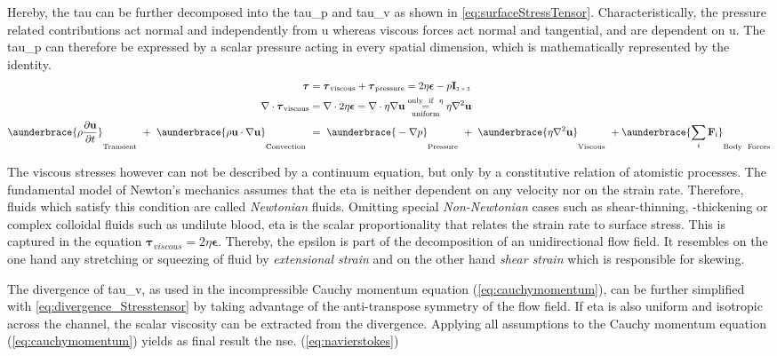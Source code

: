 Hereby, the \gls{tau} can be further decomposed into the \gls{tau_p} and \gls{tau_v} as shown in \cref{eq:surfaceStressTensor}. Characteristically, the pressure related contributions act normal and independently from \gls{u} whereas viscous forces act normal and tangential, and are dependent on \gls{u}. The \gls{tau_p} can therefore be expressed by a scalar pressure acting in every spatial dimension, which is mathematically represented by the identity. 
\begin{align}
	\boldsymbol{\tau} &= \boldsymbol{\tau}_\text{viscous} +  \boldsymbol{\tau}_\text{pressure} = 2\eta \boldsymbol{\epsilon} - p \mathbf{I}_\text{\scaleto{3 \times 3}{4pt}} \label{eq:surfaceStressTensor}\\
	\nabla \cdot \boldsymbol{\tau}_\text{viscous} &= \nabla \cdot 2\eta \boldsymbol{\epsilon} = \nabla \cdot \eta \nabla \mathbf{u} \underset{\text{uniform}}{\overset{\text{only \ if \ }\eta}{=}} \eta \nabla^2 \mathbf{u} 	\label{eq:divergence_Stresstensor} \\
	\aunderbrace{\vphantom{\sum_{i}} \rho \frac{\partial \mathbf{u}}{\partial t}}_{\text{Transient}}\ +\ \aunderbrace{\vphantom{\sum_{i}}\rho\mathbf{u} \cdot \nabla \mathbf{u}}_{\text{Convection}}\ &=\ \aunderbrace{\vphantom{\sum_{i}}-\nabla p}_{\text{Pressure}}\ +\ \aunderbrace{\vphantom{\sum_{i}}\eta \nabla^2 \mathbf{u}}_{\text{Viscous}}\ + \aunderbrace{\sum_{i}\mathbf{F}_\text{i}}_{\text{Body \ Forces}} \label{eq:navierstokes}
\end{align}

The viscous stresses however can not be described by a continuum equation, but only by a constitutive relation of atomistic processes. The fundamental model of Newton's mechanics assumes that the \gls{eta} is neither dependent on any velocity nor on the strain rate. Therefore, fluids which satisfy this condition are called \textit{Newtonian} fluids. Omitting special \textit{Non-Newtonian} cases such as shear-thinning, -thickening or complex colloidal fluids such as undilute blood, \gls{eta} is the scalar proportionality that relates the strain rate to surface stress.\cite{lit:fluidic:kirby} This is captured in the equation $\boldsymbol{\tau}_{viscous} = 2\eta \mathbf{\epsilon} $. Thereby, the \gls{epsilon} is part of the decomposition of an unidirectional flow field. It resembles on the one hand any stretching or squeezing of fluid by \textit{extensional strain} and on the other hand \textit{shear strain} which is responsible for skewing.\cite{lit:fluidic:kirby}

The divergence of \gls{tau_v}, as used in the incompressible Cauchy momentum equation (\cref{eq:cauchymomentum}), can be further simplified with \cref{eq:divergence_Stresstensor} by taking advantage of the anti-transpose symmetry of the flow field.\cite{lit:fluidic:kirby} If \gls{eta} is also uniform and isotropic across the channel, the scalar viscosity can be extracted from the divergence.  Applying all assumptions to the Cauchy momentum equation (\cref{eq:cauchymomentum}) yields as final result the \gls{nse}. (\cref{eq:navierstokes}) 

